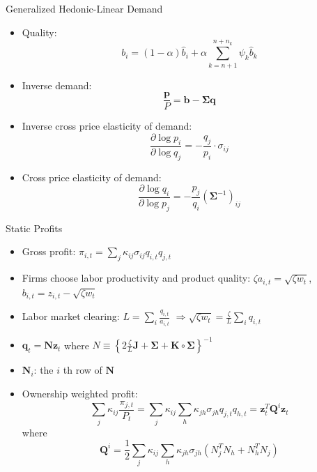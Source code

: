 \documentclass[
  10pt,               %
  aspectratio=169,    %
]{beamer}
\theoremstyle{plain}
\begin{document}
\begin{frame}{Generalized Hedonic-Linear Demand \citep{Pellegrino2024-dn}}
  \begin{itemize}
    \item Quality:
          \[
            b_{i}=\left(1-\alpha\right)\hat{b}_{i}+\alpha\sum_{k=n+1}^{n+n_{k}}\psi_{k}\hat{b}_{k}
          \]
    \item Inverse demand:
          \[
            \frac{\bm{p}}{P}=\bm{b}-\bm{\Sigma}\bm{q}
          \]
    \item Inverse cross price elasticity of demand:
          \[
            \frac{\partial\log p_{i}}{\partial\log q_{j}}=-\frac{q_{j}}{p_{i}}\cdot\sigma_{ij}
          \]
    \item Cross price elasticity of demand:
          \[
            \frac{\partial\log q_{i}}{\partial\log p_{j}}=-\frac{p_{j}}{q_{i}}(\bm{\Sigma}^{-1})_{ij}
          \]
  \end{itemize}
\end{frame}
%
\begin{frame}{Static Profits}
  \begin{itemize}
    \item \label{Q} Gross profit: $\pi_{i,t}=\sum_{j}\kappa_{ij}\sigma_{ij}q_{i,t}q_{j,t}$
    \item Firms choose labor productivity and product quality: $\zeta a_{i,t}=\sqrt{\zeta w_{t}}$,
        $b_{i,t}=z_{i,t}-\sqrt{\zeta w_{t}}$
    \item Labor market clearing: $L=\sum_{i}\frac{q_{i,t}}{a_{i,t}}$ $\Longrightarrow$$\sqrt{\zeta w_{t}}=\frac{\zeta}{L}\sum_{i}q_{i,t}$
    \item $\bm{q}_{t}=\bm{N}\bm{z}_{t}$ where $N\equiv\left\{ 2\frac{\zeta}{L}\bm{J}+\bm{\Sigma}+\bm{K}\circ\bm{\Sigma}\right\} ^{-1}$
    \item $\bm{N}_{i}$: the $i$ th row of $\bm{N}$
    \item Ownership weighted profit:
          {\small
          \[
            \sum_{j}\kappa_{ij}\frac{\pi_{j,t}}{P_{t}}=\sum_{j}\kappa_{ij}\sum_{h}\kappa_{jh}\sigma_{jh}q_{j,t}q_{h,t}=\bm{z}_{t}^{T}\bm{Q}^{i}\bm{z}_{t}
          \]}
          where
          {\small
          \[
            \bm{Q}^{i}=\frac{1}{2}\sum_{j}\kappa_{ij}\sum_{h}\kappa_{jh}\sigma_{jh}\left(N_{j}^{T}N_{h}+N_{h}^{T}N_{j}\right)
          \]
          }
          \hyperlink{cournot}{}
  \end{itemize}
\end{frame}
%
\end{document}
